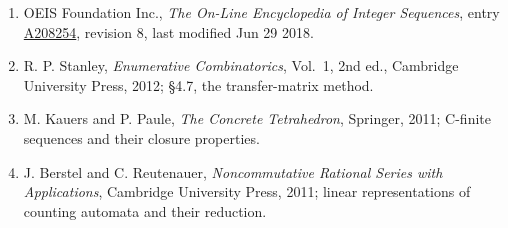 \documentclass[11pt]{article}
\theoremstyle{definition}
\begin{document}
\begin{enumerate}

\item OEIS Foundation Inc., \emph{The On-Line Encyclopedia of Integer Sequences}, entry \href{https://oeis.org/A208254}{A208254}, revision 8, last modified Jun 29 2018.

\item R. P. Stanley, \emph{Enumerative Combinatorics}, Vol.~1, 2nd ed., Cambridge University Press, 2012; \S4.7, the transfer-matrix method.

\item M. Kauers and P. Paule, \emph{The Concrete Tetrahedron}, Springer, 2011; C-finite sequences and their closure properties.

\item J. Berstel and C. Reutenauer, \emph{Noncommutative Rational Series with Applications}, Cambridge University Press, 2011; linear representations of counting automata and their reduction.

\end{enumerate}
\end{document}
